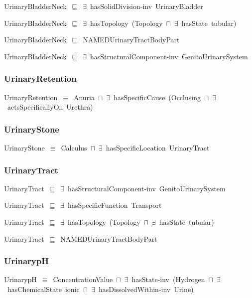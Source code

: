 \documentclass{article}
\begin{document}
UrinaryBladderNeck~\ensuremath{\sqsubseteq}~\ensuremath{\exists}~hasSolidDivision-inv~UrinaryBladder~

UrinaryBladderNeck~\ensuremath{\sqsubseteq}~\ensuremath{\exists}~hasTopology~(Topology~\ensuremath{\sqcap}~\ensuremath{\exists}~hasState~tubular)~

UrinaryBladderNeck~\ensuremath{\sqsubseteq}~NAMEDUrinaryTractBodyPart~

UrinaryBladderNeck~\ensuremath{\sqsubseteq}~\ensuremath{\exists}~hasStructuralComponent-inv~GenitoUrinarySystem~

\subsubsection*{UrinaryRetention}

UrinaryRetention~\ensuremath{\equiv}~Anuria~\ensuremath{\sqcap}~\ensuremath{\exists}~hasSpecificCause~(Occlusing~\ensuremath{\sqcap}~\ensuremath{\exists}~actsSpecificallyOn~Urethra)

\subsubsection*{UrinaryStone}

UrinaryStone~\ensuremath{\equiv}~Calculus~\ensuremath{\sqcap}~\ensuremath{\exists}~hasSpecificLocation~UrinaryTract

\subsubsection*{UrinaryTract}

UrinaryTract~\ensuremath{\sqsubseteq}~\ensuremath{\exists}~hasStructuralComponent-inv~GenitoUrinarySystem~

UrinaryTract~\ensuremath{\sqsubseteq}~\ensuremath{\exists}~hasSpecificFunction~Transport~

UrinaryTract~\ensuremath{\sqsubseteq}~\ensuremath{\exists}~hasTopology~(Topology~\ensuremath{\sqcap}~\ensuremath{\exists}~hasState~tubular)~

UrinaryTract~\ensuremath{\sqsubseteq}~NAMEDUrinaryTractBodyPart~

\subsubsection*{UrinarypH}

UrinarypH~\ensuremath{\equiv}~ConcentrationValue~\ensuremath{\sqcap}~\ensuremath{\exists}~hasState-inv~(Hydrogen~\ensuremath{\sqcap}~\ensuremath{\exists}~hasChemicalState~ionic~\ensuremath{\sqcap}~\ensuremath{\exists}~hasDissolvedWithin-inv~Urine)
\end{document}
